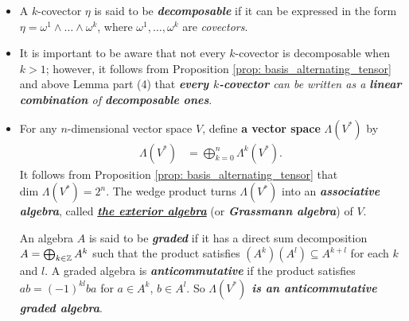 \documentclass[11pt]{article}
\begin{document}
\begin{itemize}
\item \begin{definition}
A $k$-covector $\eta$ is said to be \emph{\textbf{decomposable}} if it can be expressed in the form $\eta = \omega^1 \wedge \ldots \wedge \omega^k$, where $\omega^1,\ldots, \omega^k$ are \emph{covectors}. 
\end{definition}

\item \begin{remark}
It is important to be aware that not every $k$-covector is decomposable when $k > 1$; however, it follows from Proposition \ref{prop: basis_alternating_tensor} and above Lemma part (4) that \emph{\textbf{every $k$-covector} can be written as a \textbf{linear combination} of \textbf{decomposable ones}}.
\end{remark}

\item \begin{definition}
For any $n$-dimensional vector space $V$, define \textbf{a vector space} $\Lambda(V^{*})$ by
\begin{align*}
\Lambda(V^{*}) &= \bigoplus_{k=0}^{n} \Lambda^k(V^{*}).
\end{align*}
It follows from Proposition \ref{prop: basis_alternating_tensor} that $\text{dim }\Lambda(V^{*}) = 2^n$. The wedge product turns $\Lambda(V^{*})$ into an \emph{\textbf{associative algebra}}, called \underline{\emph{\textbf{the exterior algebra}}} (or \emph{\textbf{Grassmann algebra}}) of $V$.  

An algebra $A$ is said to be \emph{\textbf{graded}} if it has a direct sum decomposition $A = \bigoplus_{k\in {\mathbb Z}}A^k$ such that the product satisfies $(A^k)(A^l) \subseteq A^{k+l}$ for each $k$ and $l$. A graded algebra is \emph{\textbf{anticommutative}} if the product satisfies $ab = (-1)^{kl}ba$ for $a \in A^k$, $b \in A^l$.  So \emph{\textbf{$\Lambda(V^{*})$ is an anticommutative graded algebra}}.
\end{definition}


\end{itemize}
\end{document}

